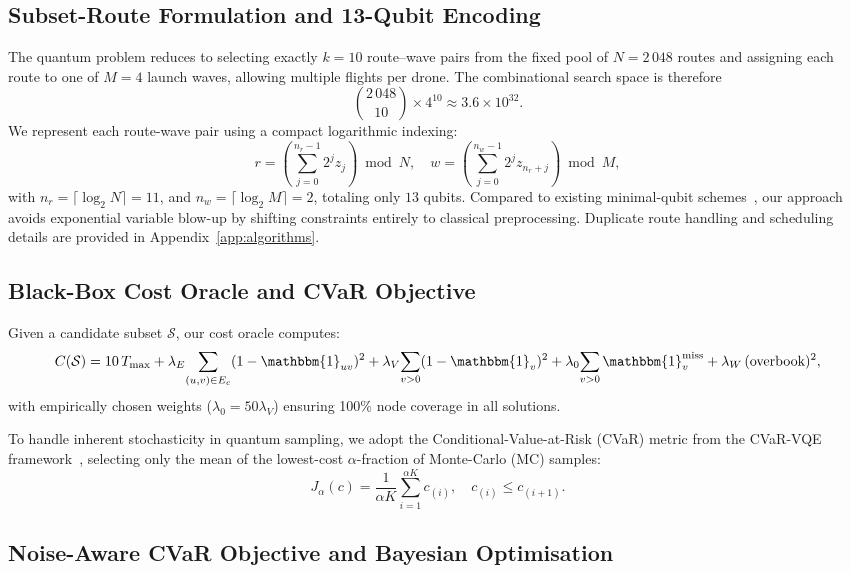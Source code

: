 \subsection{Subset-Route Formulation and 13-Qubit Encoding}

The quantum problem reduces to selecting exactly \(k=10\) route–wave pairs from the fixed pool of \(N=2\,048\) routes and assigning each route to one of \(M=4\) launch waves, allowing multiple flights per drone. The combinational search space is therefore
\[
{2\,048 \choose 10}\times4^{10}\approx3.6\times10^{32}.
\]
We represent each route-wave pair using a compact logarithmic indexing:
\[
r=\left(\sum_{j=0}^{n_r-1}2^{j} z_j\right)\!\bmod N,\quad
w=\left(\sum_{j=0}^{n_w-1}2^{j} z_{n_r+j}\right)\!\bmod M,
\]
with \(n_r=\lceil\log_2 N\rceil=11\), and \(n_w=\lceil\log_2 M\rceil=2\), totaling only \(13\) qubits. Compared to existing minimal-qubit schemes~\cite{davies_quantum_2024,leonidas_qubit_2023}, our approach avoids exponential variable blow-up by shifting constraints entirely to classical preprocessing. Duplicate route handling and scheduling details are provided in Appendix~\ref{app:algorithms}.

\subsection{Black-Box Cost Oracle and CVaR Objective}\label{sec:cost}

Given a candidate subset \(\mathcal{S}\), our cost oracle computes:
\[
C(\mathcal{S}) = 
10\,T_{\max} + 
\lambda_E\!\sum_{(u,v)\in E_c}(1-\mathbbm{1}_{uv})^{2} +
\lambda_V\!\sum_{v>0}(1-\mathbbm{1}_{v})^{2} +
\lambda_0\!\sum_{v>0}\mathbbm{1}_{v}^{\mathrm{miss}} +
\lambda_W\,(\text{overbook})^{2},
\]
with empirically chosen weights (\(\lambda_0=50\lambda_V\)) ensuring 100\% node coverage in all solutions.

To handle inherent stochasticity in quantum sampling, we adopt the Conditional-Value-at-Risk (CVaR) metric from the CVaR-VQE framework~\cite{barkoutsos2020cvar}, selecting only the mean of the lowest-cost $\alpha$-fraction of Monte-Carlo (MC) samples:
\[
J_{\alpha}(c)=\frac{1}{\alpha K}\sum_{i=1}^{\alpha K} c_{(i)},\quad c_{(i)}\le c_{(i+1)}.
\]

\subsection{Noise-Aware CVaR Objective and Bayesian Optimisation}

